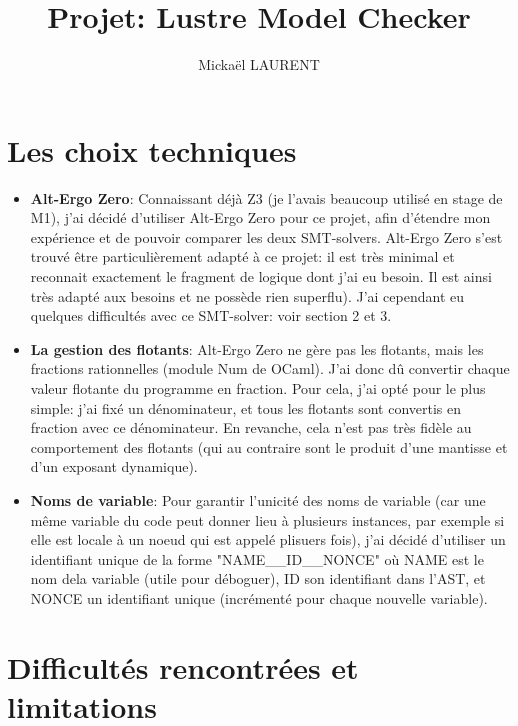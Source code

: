 \documentclass[a4paper]{article}%
\title{\vspace{1.5cm}Projet: Lustre Model Checker}
\author{Mickaël LAURENT}
\date{\vspace{-5ex}}
\begin{document}
    \maketitle

    \section{Les choix techniques}
		
	\begin{itemize}
		\item \textbf{Alt-Ergo Zero}: Connaissant déjà Z3 (je l'avais beaucoup utilisé en stage de M1), j'ai décidé d'utiliser Alt-Ergo Zero pour ce projet,
		afin d'étendre mon expérience et de pouvoir comparer les deux SMT-solvers. Alt-Ergo Zero s'est trouvé être particulièrement adapté à ce projet:
		il est très minimal et reconnait exactement le fragment de logique dont j'ai eu besoin. Il est ainsi très adapté aux besoins et ne possède rien superflu).
		J'ai cependant eu quelques difficultés avec ce SMT-solver: voir section 2 et 3.
		\item \textbf{La gestion des flotants}: Alt-Ergo Zero ne gère pas les flotants, mais les fractions rationnelles (module Num de OCaml).
		J'ai donc dû convertir chaque valeur flotante du programme en fraction. Pour cela, j'ai opté pour le plus simple: j'ai fixé un dénominateur,
		et tous les flotants sont convertis en fraction avec ce dénominateur.
		En revanche, cela n'est pas très fidèle au comportement des flotants (qui au contraire sont le produit d'une mantisse et d'un exposant dynamique).
		\item \textbf{Noms de variable}: Pour garantir l'unicité des noms de variable (car une même variable du code peut donner lieu à plusieurs instances,
		par exemple si elle est locale à un noeud qui est appelé plisuers fois), j'ai décidé d'utiliser un identifiant unique de la forme "NAME\_\_ID\_\_NONCE"
		où NAME est le nom dela variable (utile pour déboguer), ID son identifiant dans l'AST, et NONCE un identifiant unique (incrémenté pour chaque nouvelle variable).
	\end{itemize}

	\section{Difficultés rencontrées et limitations}
\end{document}
